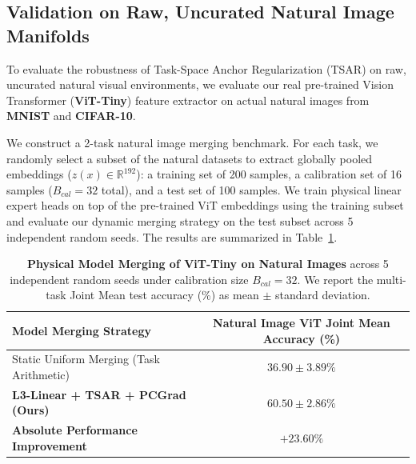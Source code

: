 \subsection{Validation on Raw, Uncurated Natural Image Manifolds}
\label{sec:natural_images_validation}

To evaluate the robustness of Task-Space Anchor Regularization (TSAR) on raw, uncurated natural visual environments, we evaluate our real pre-trained Vision Transformer (\textbf{ViT-Tiny}) feature extractor on actual natural images from \textbf{MNIST} and \textbf{CIFAR-10}. 

We construct a 2-task natural image merging benchmark. For each task, we randomly select a subset of the natural datasets to extract globally pooled embeddings ($z(x) \in \mathbb{R}^{192}$): a training set of 200 samples, a calibration set of 16 samples ($B_{cal} = 32$ total), and a test set of 100 samples. We train physical linear expert heads on top of the pre-trained ViT embeddings using the training subset and evaluate our dynamic merging strategy on the test subset across 5 independent random seeds. The results are summarized in Table~\ref{tab:natural_images_results}.

\begin{table}[h]
\caption{\textbf{Physical Model Merging of ViT-Tiny on Natural Images} across 5 independent random seeds under calibration size $B_{cal}=32$. We report the multi-task Joint Mean test accuracy (\%) as mean $\pm$ standard deviation.}
\label{tab:natural_images_results}
\vskip 0.15in
\begin{center}
\begin{small}
\begin{sc}
\begin{tabular}{lc}
\toprule
Model Merging Strategy & Natural Image ViT Joint Mean Accuracy (\%) \\
\midrule
Static Uniform Merging (Task Arithmetic) & $36.90 \pm 3.89\%$ \\
\textbf{L3-Linear + TSAR + PCGrad (Ours)} & $\mathbf{60.50 \pm 2.86\%}$ \\
\midrule
\textbf{Absolute Performance Improvement} & $\mathbf{+23.60\%}$ \\
\bottomrule
\end{tabular}
\end{sc}
\end{small}
\end{center}
\vskip -0.1in
\end{table}

